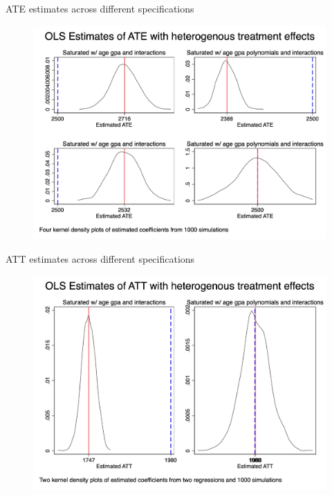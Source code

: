 \documentclass{beamer}
\begin{document}
\begin{frame}{ATE estimates across different specifications}

\begin{figure}
\begin{center}
             \includegraphics[scale=0.1]{./lecture_includes/combined_kernels_ate.jpg}
\end{center}
\end{figure}

\end{frame}



\begin{frame}{ATT estimates across different specifications}

\begin{figure}
\begin{center}
             \includegraphics[scale=0.1]{./lecture_includes/combined_kernels_att.jpg}
\end{center}
\end{figure}

\end{frame}
\end{document}
